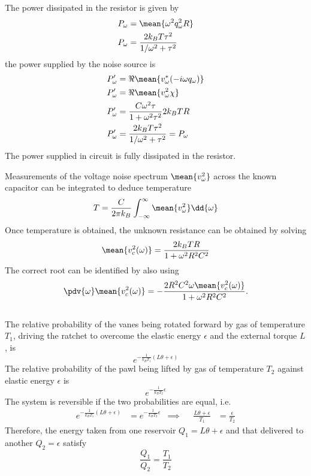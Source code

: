 \documentclass[12pt]{article}
\begin{document}
    The power dissipated in the resistor is given by \begin{align*}
        P_{\omega} &= \mean{\omega^2 q_\omega^2 R}\\
        P_{\omega} &= \frac{2 k_B T \tau^2 }{1 /\omega^2 + \tau^2} 
    \end{align*}
    the power supplied by the noise source is \begin{align*}
        P'_\omega &= \Re{\mean{v^*_\omega ( - i\omega q_\omega)}}\\
        P'_\omega &= \Re{\mean{v^2_\omega  \chi}}\\
        P'_\omega &= \frac{C \omega^2 \tau }{1 + \omega^2 \tau^2} 2 k_B TR\\
        P'_\omega &= \frac{2 k_B T \tau^2 }{1 /\omega^2 + \tau^2} = P_\omega
    \end{align*}
    The power supplied in circuit is fully dissipated in the resistor. 

    Measurements of the voltage noise spectrum \(\mean{v_\omega^2}\) across the known capacitor can be integrated to deduce temperature \[
        T = \frac{C}{2\pi k_B} \int_{ -\infty}^{\infty} \mean{v_\omega^2} \dd{\omega}
    \]
    Once temperature is obtained, the unknown resistance can be obtained by solving \[
        \mean{v_c^2(\omega)} = \frac{2 k_B T R}{1 + \omega^2 R^2 C^2}
    \]
    The correct root can be identified by also using \[
        \pdv{\omega}\mean{v_c^2(\omega)} = -\frac{2R^2 C^2 \omega\mean{v_c^2(\omega)}}{1 + \omega^2 R^2 C^2}.
    \]
     \subsection{} The relative probability of the vanes being rotated forward by gas of temperature \(T_1\), driving the ratchet to overcome the elastic energy \(\epsilon\) and the external torque \(L\), is \[
        e^{ - \frac{1}{k_BT_1} (L\theta +\epsilon)}
    \]
    The relative probability of the pawl being lifted by gas of temperature \(T_2\) against elastic energy \(\epsilon\) is \[
        e^{ - \frac{1}{k_BT_2} \epsilon}
    \]
    The system is reversible if the two probabilities are equal, i.e. \begin{align*}
        e^{ - \frac{1}{k_BT_1} (L\theta +\epsilon)} &= e^{ - \frac{1}{k_BT_2} \epsilon} &\implies&& \frac{L\theta +\epsilon}{T_1} &= \frac{\epsilon}{T_2}
    \end{align*}
    Therefore, the energy taken from one reservoir \(Q_1 = L\theta +\epsilon\) and that delivered to another \(Q_2 = \epsilon\) satisfy \[
        \frac{Q_1}{Q_2} = \frac{T_1}{T_2}
    \]
\end{document}
